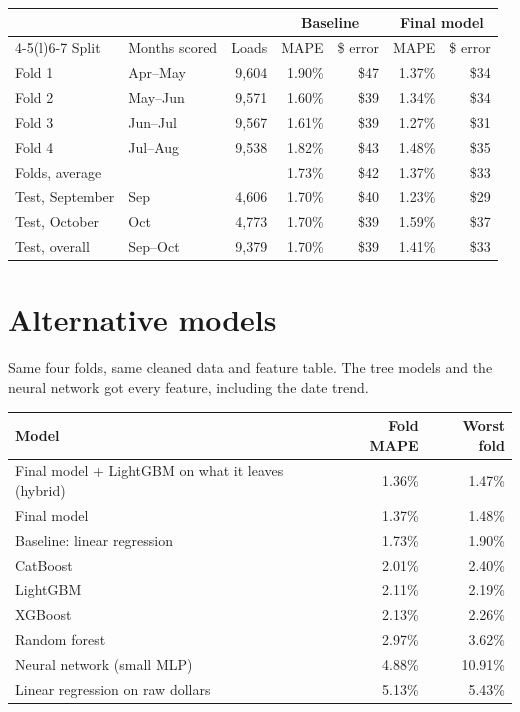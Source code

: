 \documentclass[10pt,twocolumn,letterpaper]{article}
\begin{document}
\begin{center}
\small
\begin{tabular}{@{}llrrrrr@{}}
  \toprule
  & & & \multicolumn{2}{c}{Baseline} & \multicolumn{2}{c}{Final model} \\
  \cmidrule(lr){4-5}\cmidrule(l){6-7}
  Split & Months scored & Loads & MAPE & \$ error & MAPE & \$ error \\
  \midrule
  Fold 1 & Apr--May & 9,604 & 1.90\% & \$47 & 1.37\% & \$34 \\
  Fold 2 & May--Jun & 9,571 & 1.60\% & \$39 & 1.34\% & \$34 \\
  Fold 3 & Jun--Jul & 9,567 & 1.61\% & \$39 & 1.27\% & \$31 \\
  Fold 4 & Jul--Aug & 9,538 & 1.82\% & \$43 & 1.48\% & \$35 \\
  Folds, average & & & 1.73\% & \$42 & 1.37\% & \$33 \\
  \midrule
  Test, September & Sep & 4,606 & 1.70\% & \$40 & 1.23\% & \$29 \\
  Test, October & Oct & 4,773 & 1.70\% & \$39 & 1.59\% & \$37 \\
  Test, overall & Sep--Oct & 9,379 & 1.70\% & \$39 & 1.41\% & \$33 \\
  \bottomrule
\end{tabular}
\end{center}

\section{Alternative models}\label{app:alternatives}

Same four folds, same cleaned data and feature table. The tree models and the neural network got every feature, including the date trend.

\begin{center}
\small
\begin{tabular}{@{}lrr@{}}
  \toprule
  Model & Fold MAPE & Worst fold \\
  \midrule
  Final model + LightGBM on what it leaves (hybrid) & 1.36\% & 1.47\% \\
  Final model & 1.37\% & 1.48\% \\
  Baseline: linear regression & 1.73\% & 1.90\% \\
  CatBoost & 2.01\% & 2.40\% \\
  LightGBM & 2.11\% & 2.19\% \\
  XGBoost & 2.13\% & 2.26\% \\
  Random forest & 2.97\% & 3.62\% \\
  Neural network (small MLP) & 4.88\% & 10.91\% \\
  Linear regression on raw dollars & 5.13\% & 5.43\% \\
  \bottomrule
\end{tabular}
\end{center}
\end{document}
